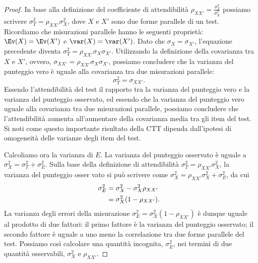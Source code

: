 \begin{proof}
In base alla definizione del coefficiente di attendibilità
$
\rho_{XX'} = \frac{\sigma^2_T}{\sigma^2_X}
$
possiamo scrivere
$
\sigma^2_T = \rho_{XX'} \sigma^2_X
$, 
dove $X$ e $X'$ sono due forme parallele di un test. Ricordiamo che misurazioni parallele hanno le seguenti proprietà: $\Ev(X) = \Ev(X')$ e $\var(X) = \var(X')$. 
Dato che $\sigma_{X}=\sigma_{X'}$, l'equazione precedente diventa
$
\sigma^2_T = \rho_{XX'} \sigma_X\sigma_{X'}. 
$
Utilizzando la definizione della covarianza tra $X$ e $X'$, ovvero, $\sigma_{XX'}=\rho_{XX'}\sigma_X\sigma_{X'}$, possiamo concludere che la varianza del punteggio vero è uguale alla covarianza tra due misurazioni parallele:
\begin{equation}
\sigma^2_T =  \sigma_{XX'}.
\end{equation}
Essendo l'attendibilità del test il rapporto tra la varianza del punteggio vero e la varianza del punteggio osservato, ed essendo che la varianza del punteggio vero uguale alla covarianza tra due misurazioni parallele, possiamo concludere che l'attendibilità aumenta all'aumentare della covarianza media tra gli item del test. 
Si noti come questo importante risultato della CTT dipenda dall'ipotesi di omogeneità delle varianze degli item del test.   

Calcoliamo ora  la varianza di $E$. La varianza del punteggio osservato è uguale a 
$
\sigma^2_X = \sigma^2_T + \sigma^2_E. 
$
Sulla base della definizione di attendibilità 
$
\sigma^2_T = \rho_{XX'} \sigma^2_X
$, 
la varianza del punteggio osser vato si può scrivere come
$
\sigma^2_X =\rho_{XX'} \sigma^2_X + \sigma^2_E
$, 
da cui
\begin{align}
\sigma^2_E &= \sigma^2_X -    \sigma^2_X\rho_{XX'}\notag\\
&= \sigma^2_X (1 -\rho_{XX'}).\notag
\end{align}
La varianza degli errori della misurazione $\sigma^2_E = \sigma^2_X (1 -\rho_{XX'})$ 
è dunque uguale al prodotto di due fattori: il primo fattore è la varianza del punteggio osservato; il secondo fattore è uguale a uno meno la correlazione tra due forme parallele del test. Possiamo così calcolare una quantità incognita, $\sigma^2_E$, nei
termini di due quantità osservabili, $\sigma^2_X$ e $\rho_{XX'}$. 

\end{proof}


